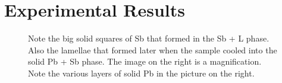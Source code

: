 \documentclass{article}
\begin{document}
\section{Experimental Results}
\begin{figure}[H]
\centering
{}
\caption{Note the big solid squares of Sb that formed in the Sb + L phase. Also the lamellae that formed later when the sample cooled into the solid Pb + Sb phase. The image on the right is a magnification. Note the various layers of solid Pb in the picture on the right.}
\label{fig:images}
\end{figure}
\end{document}

